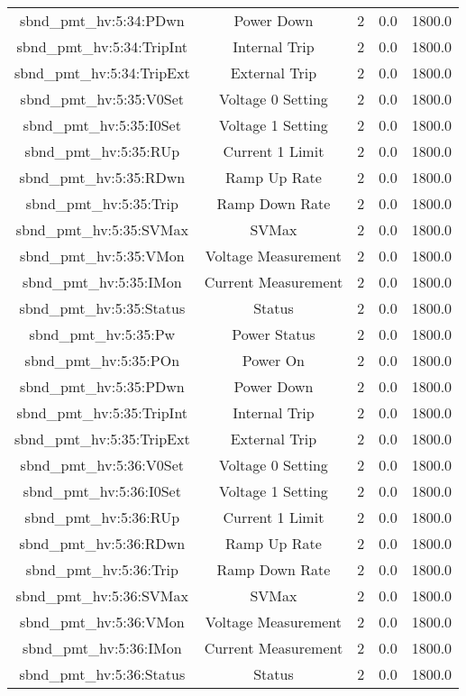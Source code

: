 \begin{table}[ptb]
\begin{tabular}{c | c c c c}
sbnd_pmt_hv:5:34:PDwn & Power Down & 2 & 0.0 & 1800.0\\ 
sbnd_pmt_hv:5:34:TripInt & Internal Trip & 2 & 0.0 & 1800.0\\ 
sbnd_pmt_hv:5:34:TripExt & External Trip & 2 & 0.0 & 1800.0\\ 
sbnd_pmt_hv:5:35:V0Set & Voltage 0 Setting & 2 & 0.0 & 1800.0\\ 
sbnd_pmt_hv:5:35:I0Set & Voltage 1 Setting & 2 & 0.0 & 1800.0\\ 
sbnd_pmt_hv:5:35:RUp & Current 1 Limit & 2 & 0.0 & 1800.0\\ 
sbnd_pmt_hv:5:35:RDwn & Ramp Up Rate & 2 & 0.0 & 1800.0\\ 
sbnd_pmt_hv:5:35:Trip & Ramp Down Rate & 2 & 0.0 & 1800.0\\ 
sbnd_pmt_hv:5:35:SVMax & SVMax & 2 & 0.0 & 1800.0\\ 
sbnd_pmt_hv:5:35:VMon & Voltage Measurement & 2 & 0.0 & 1800.0\\ 
sbnd_pmt_hv:5:35:IMon & Current Measurement & 2 & 0.0 & 1800.0\\ 
sbnd_pmt_hv:5:35:Status & Status & 2 & 0.0 & 1800.0\\ 
sbnd_pmt_hv:5:35:Pw & Power Status & 2 & 0.0 & 1800.0\\ 
sbnd_pmt_hv:5:35:POn & Power On & 2 & 0.0 & 1800.0\\ 
sbnd_pmt_hv:5:35:PDwn & Power Down & 2 & 0.0 & 1800.0\\ 
sbnd_pmt_hv:5:35:TripInt & Internal Trip & 2 & 0.0 & 1800.0\\ 
sbnd_pmt_hv:5:35:TripExt & External Trip & 2 & 0.0 & 1800.0\\ 
sbnd_pmt_hv:5:36:V0Set & Voltage 0 Setting & 2 & 0.0 & 1800.0\\ 
sbnd_pmt_hv:5:36:I0Set & Voltage 1 Setting & 2 & 0.0 & 1800.0\\ 
sbnd_pmt_hv:5:36:RUp & Current 1 Limit & 2 & 0.0 & 1800.0\\ 
sbnd_pmt_hv:5:36:RDwn & Ramp Up Rate & 2 & 0.0 & 1800.0\\ 
sbnd_pmt_hv:5:36:Trip & Ramp Down Rate & 2 & 0.0 & 1800.0\\ 
sbnd_pmt_hv:5:36:SVMax & SVMax & 2 & 0.0 & 1800.0\\ 
sbnd_pmt_hv:5:36:VMon & Voltage Measurement & 2 & 0.0 & 1800.0\\ 
sbnd_pmt_hv:5:36:IMon & Current Measurement & 2 & 0.0 & 1800.0\\ 
sbnd_pmt_hv:5:36:Status & Status & 2 & 0.0 & 1800.0\\ 

\end{tabular}
\end{table}
